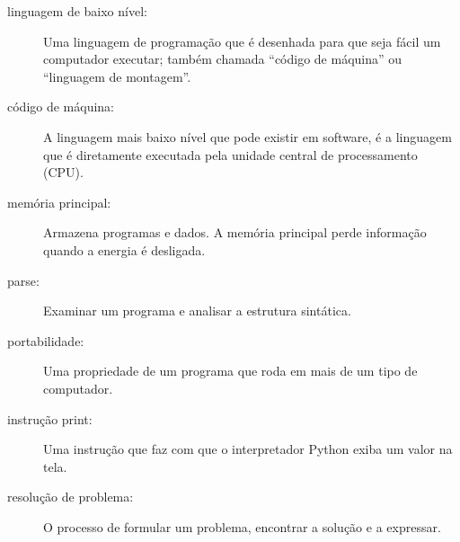 \begin{description}
\item[linguagem de baixo nível:]  Uma linguagem de programação que é desenhada
para que seja fácil um computador executar; também chamada ``código de máquina'' ou
``linguagem de montagem''.
%

\item[código de máquina:]  A linguagem mais baixo nível que pode existir em software, é
a linguagem que é diretamente executada pela unidade central de processamento
(CPU).
%

\item[memória principal:] Armazena programas e dados. A memória principal
perde informação quando a energia é desligada.
%

\item[parse:]  Examinar um programa e analisar a estrutura sintática.
%

\item[portabilidade:]  Uma propriedade de um programa que roda em
mais de um tipo de computador.
%

\item[instrução print:]  Uma instrução que faz com que o interpretador Python
exiba um valor na tela.
%

\item[resolução de problema:]  O processo de formular um problema, encontrar
a solução e a expressar.
%


\end{description}
